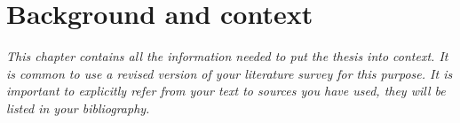 \chapter{Background and context}
\emph{This chapter contains all the information needed to put the thesis into
context. It is common to use a revised version of your literature survey for this purpose. It
is important to explicitly refer from your text to sources you have used, they will be listed in
your bibliography.}